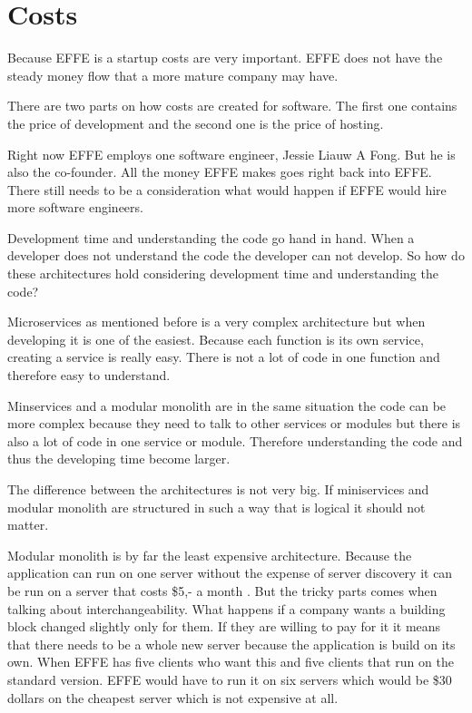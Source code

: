 \section{Costs}
\label{sec:Costs}

Because EFFE is a startup costs are very important. EFFE does not have the steady money flow that a more mature company may have.

There are two parts on how costs are created for software. The first one contains the price of development and the second one is the price of hosting.

Right now EFFE employs one software engineer, Jessie Liauw A Fong. But he is also the co-founder. All the money EFFE makes goes right back into EFFE. There still needs to be a consideration what would happen if EFFE would hire more software engineers.

Development time and understanding the code go hand in hand. When a developer does not understand the code the developer can not develop. So how do these architectures hold considering development time and understanding the code?

Microservices as mentioned before is a very complex architecture but when developing it is one of the easiest. Because each function is its own service, creating a service is really easy. There is not a lot of code in one function and therefore easy to understand.

Minservices and a modular monolith are in the same situation the code can be more complex because they need to talk to other services or modules but there is also a lot of code in one service or module. Therefore understanding the code and thus the developing time become larger.

The difference between the architectures is not very big. If miniservices and modular monolith are structured in such a way that is logical it should not matter.

Modular monolith is by far the least expensive architecture. Because the application can run on one server without the expense of server discovery it can be run on a server that costs \$5,- a month \cite{digitalOcean}. But the tricky parts comes when talking about interchangeability. What happens if a company wants a building block changed slightly only for them. If they are willing to pay for it it means that there needs to be a whole new server because the application is build on its own. When EFFE has five clients who want this and five clients that run on the standard version. EFFE would have to run it on six servers which would be \$30 dollars on the cheapest server which is not expensive at all.

